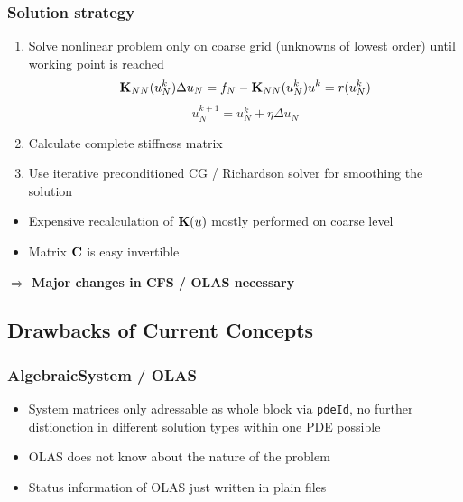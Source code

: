 \subsubsection{Solution strategy}
 \begin{enumerate}
  \item Solve nonlinear problem only on coarse grid (unknowns of lowest order)
until working point is reached 
\[ \displaystyle
{\bf K}_{NN}(u_N^k) \Delta u_N = f_N - {\bf K}_{NN}(u_{N}^k) u^k = r(u_N^k)
\]
\[ \displaystyle
u^{k+1}_N = u^k_{N} + \eta \Delta u_N
\]
\item Calculate complete stiffness matrix
\item Use iterative preconditioned CG / Richardson solver for smoothing the
solution
 \end{enumerate}

\begin{itemize}
\item Expensive recalculation of ${\bf K}(u)$ mostly performed on coarse level
\item Matrix $\bf{C}$ is easy invertible
\end{itemize}
{\bf $\Rightarrow$ Major changes in CFS / OLAS necessary}


\subsection{Drawbacks of Current Concepts}
\subsubsection{AlgebraicSystem / OLAS}
  \begin{itemize}
  \item System matrices only adressable as whole block via \verb+pdeId+, no further distionction in different solution types within one PDE possible
  \item OLAS does not know about the nature of the problem
  \item Status information of OLAS just written in plain files
  \end{itemize}

